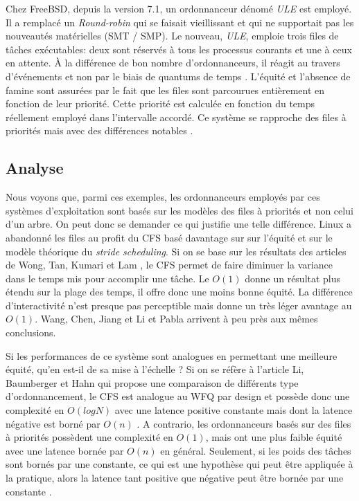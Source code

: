 \documentclass[letterpaper]{article}
\begin{document}
Chez FreeBSD, depuis la version 7.1, un ordonnanceur dénomé \textit{ULE} est employé. Il a remplacé un \textit{Round-robin} qui se faisait vieillissant et qui ne supportait pas les nouveautés matérielles (SMT / SMP). Le nouveau, \textit{ULE}, emploie trois files de tâches exécutables: deux sont réservés à tous les processus courants et une à ceux en attente. À la différence de bon nombre d'ordonnanceurs, il réagit au travers d'événements et non par le biais de quantums de temps \citep{roberson2003ule}. L'équité et l'absence de famine sont assurées par le fait que les files sont parcourues entièrement en fonction de leur priorité. Cette priorité est calculée en fonction du temps réellement employé dans l'intervalle accordé. Ce système se rapproche des files à priorités mais avec des différences notables \citep{mckusick2014design}.

\subsection{Analyse}

Nous voyons que, parmi ces exemples, les ordonnanceurs employés par ces systèmes d'exploitation sont basés sur les modèles des files à priorités et non celui d'un arbre. On peut donc se demander ce qui justifie une telle différence. Linux a abandonné les files au profit du CFS basé davantage sur sur l'équité et sur le modèle théorique du \textit{stride scheduling}. Si on se base sur les résultats des articles de Wong, Tan, Kumari et Lam \citep{4631872, Wong:2008:TAF:1400097.1400102}, le CFS permet de faire diminuer la variance dans le temps mis pour accomplir une tâche. Le $O(1)$ donne un résultat plus étendu sur la plage des temps, il offre donc une moins bonne équité. La différence d'interactivité n'est presque pas perceptible mais donne un très léger avantage au $O(1)$. Wang, Chen, Jiang et Li \citep{5279631} et Pabla \citep{Pabla:2009:CFS:1594371.1594375} arrivent à peu près aux mêmes conclusions.

Si les performances de ce système sont analogues en permettant une meilleure équité, qu'en est-il de sa mise à l'échelle ? Si on se réfère à l'article Li, Baumberger et Hahn \citep{li2009efficient} qui propose une comparaison de différents type d'ordonnancement, le CFS est analogue au WFQ par design et possède donc une complexité en $O(log N)$ avec une latence positive constante mais dont la latence négative est borné par $O(n)$ \citep{234856}. A contrario, les ordonnanceurs basés sur des files à priorités possèdent une complexité en $O(1)$, mais ont une plus faible équité avec une latence bornée par $O(n)$ en général. Seulement, si les poids des tâches sont bornés par une constante, ce qui est une hypothèse qui peut être appliquée à la pratique, alors la latence tant positive que négative peut être bornée par une constante \citep{Shreedhar:1995:EFQ:217391.217453}.
\end{document}
